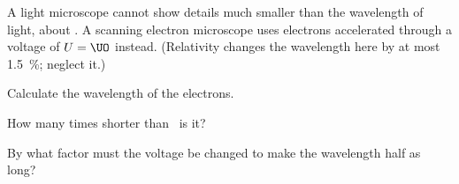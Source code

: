 A light microscope cannot show details much smaller than the wavelength of light, about \lliO. A scanning electron microscope uses electrons accelerated through a voltage of $U = \UO$ instead. (Relativity changes the wavelength here by at most \SI{1.5}{\percent}; neglect it.)

\begin{abcliste}
\abc Calculate the wavelength of the electrons.

\abc How many times shorter than \lliO\ is it?

\abc By what factor must the voltage be changed to make the wavelength half as long?
\end{abcliste}

